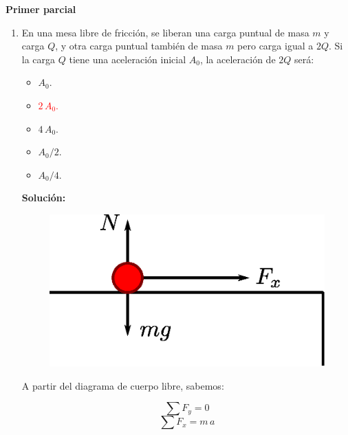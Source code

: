 \documentclass[letter,11pt]{article}
\begin{document}
\begin{center}
    {\Large \bf{Primer parcial}}
\end{center}

\noindent{}

\vspace{0.5cm}

\begin{enumerate}
\item En una mesa libre de fricción, se liberan una carga puntual de masa $m$ y
carga $Q$, y otra carga puntual también de masa $m$ pero carga igual a $2Q$. Si
la carga $Q$ tiene una aceleración inicial $A_0$, la aceleración de $2Q$ será:

\begin{itemize}
    \item $A_0$.
    \item \textcolor{red}{$2\,A_0$.}
    \item $4\,A_0$.
    \item $A_0/2$.
    \item $A_0/4$.
\end{itemize}

\textbf{Solución:}

\begin{figure}[!h]
\centering
\includegraphics[scale=0.39]{resources/a1.eps}
\end{figure}

A partir del diagrama de cuerpo libre, sabemos:

\begin{equation*}
    \sum F_y = 0
\end{equation*}
\begin{equation*}
    \sum F_x = m\,a
\end{equation*}


\end{enumerate}
\end{document}
